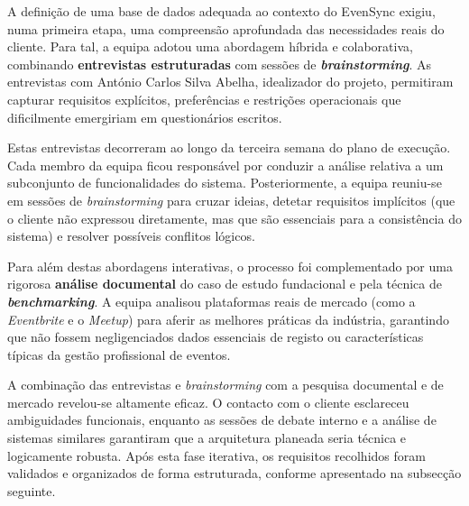\documentclass[runningheads]{llncs}
\begin{document}
                A definição de uma base de dados adequada ao contexto do EvenSync exigiu, numa primeira etapa, uma
                compreensão aprofundada das necessidades reais do cliente. Para tal, a equipa adotou uma abordagem
                híbrida e colaborativa, combinando \textbf{entrevistas estruturadas} com sessões de \textbf{\textit{brainstorming}}.
                As entrevistas com António Carlos Silva Abelha, idealizador do projeto, permitiram capturar requisitos explícitos,
                preferências e restrições operacionais que dificilmente emergiriam em questionários escritos.

                \vspace{0.2cm}

                Estas entrevistas decorreram ao longo da terceira semana do plano de execução. Cada membro
                da equipa ficou responsável por conduzir a análise relativa a um subconjunto de funcionalidades do
                sistema. Posteriormente, a equipa reuniu-se em sessões de \textit{brainstorming} para cruzar
                ideias, detetar requisitos implícitos (que o cliente não expressou diretamente, mas que são
                essenciais para a consistência do sistema) e resolver possíveis conflitos lógicos.

                \vspace{0.2cm}

                Para além destas abordagens interativas, o processo foi complementado por uma rigorosa
                \textbf{análise documental} do caso de estudo fundacional e pela técnica de
                \textbf{\textit{benchmarking}}. A equipa analisou plataformas reais de mercado (como a
                \textit{Eventbrite} e o \textit{Meetup}) para aferir as melhores práticas da indústria,
                garantindo que não fossem negligenciados dados essenciais de registo ou características típicas
                da gestão profissional de eventos.

                \vspace{0.2cm}

                A combinação das entrevistas e \textit{brainstorming} com a pesquisa documental e de mercado
                revelou-se altamente eficaz. O contacto com o cliente esclareceu ambiguidades funcionais,
                enquanto as sessões de debate interno e a análise de sistemas similares garantiram que a
                arquitetura planeada seria técnica e logicamente robusta. Após esta fase iterativa, os
                requisitos recolhidos foram validados e organizados de forma estruturada, conforme apresentado
                na subsecção seguinte.
\end{document}

